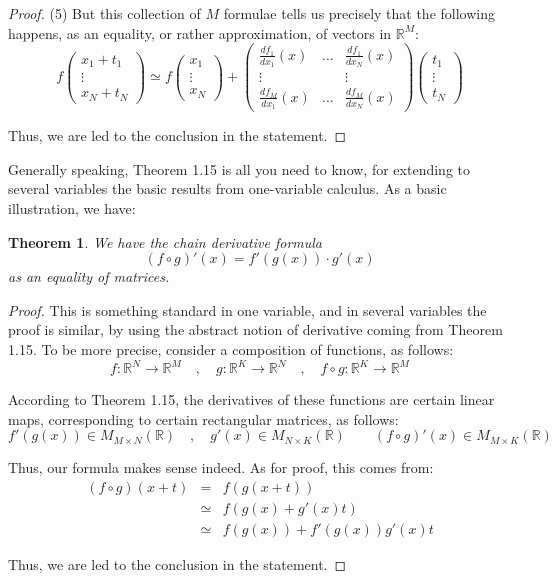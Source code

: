 \documentclass[12pt]{amsbook}
\newtheorem{theorem}{Theorem}[chapter]
\begin{document}
\begin{proof}
(5) But this collection of $M$ formulae tells us precisely that the following happens, as an equality, or rather approximation, of vectors in $\mathbb R^M$:
$$f\begin{pmatrix}x_1+t_1\\ \vdots\\ x_N+t_N\end{pmatrix}
\simeq f\begin{pmatrix}x_1\\ \vdots\\ x_N\end{pmatrix}
+\begin{pmatrix}
\frac{df_1}{dx_1}(x)&\ldots&\frac{df_1}{dx_N}(x)\\
\vdots&&\vdots\\
\frac{df_M}{dx_1}(x)&\ldots&\frac{df_M}{dx_N}(x)
\end{pmatrix}\begin{pmatrix}t_1\\ \vdots\\ t_N\end{pmatrix}$$

Thus, we are led to the conclusion in the statement.
\end{proof}

Generally speaking, Theorem 1.15 is all you need to know, for extending to several variables the basic results from one-variable calculus. As a basic illustration, we have:


\begin{theorem}
We have the chain derivative formula
$$(f\circ g)'(x)=f'(g(x))\cdot g'(x)$$
as an equality of matrices.
\end{theorem}

\begin{proof}
This is something standard in one variable, and in several variables the proof is similar, by using the abstract notion of derivative coming from Theorem 1.15. To be more precise, consider a composition of functions, as follows:
$$f:\mathbb R^N\to\mathbb R^M\quad,\quad 
g:\mathbb R^K\to\mathbb R^N\quad,\quad 
f\circ g:\mathbb R^K\to\mathbb R^M$$

According to Theorem 1.15, the derivatives of these functions are certain linear maps, corresponding to certain rectangular matrices, as follows:
$$f'(g(x))\in M_{M\times N}(\mathbb R)\quad,\quad 
g'(x)\in M_{N\times K}(\mathbb R)\quad\quad
(f\circ g)'(x)\in M_{M\times K}(\mathbb R)$$

Thus, our formula makes sense indeed. As for proof, this comes from:
\begin{eqnarray*}
(f\circ g)(x+t)
&=&f(g(x+t))\\
&\simeq&f(g(x)+g'(x)t)\\
&\simeq&f(g(x))+f'(g(x))g'(x)t
\end{eqnarray*}

Thus, we are led to the conclusion in the statement.
\end{proof}
\end{document}
